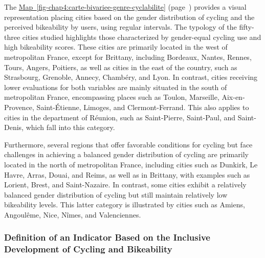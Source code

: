 \begin{refsegment}
The \hyperref[fig-chap4:carte-bivariee-genre-cyclabilite]{Map~\ref{fig-chap4:carte-bivariee-genre-cyclabilite}} (page~\pageref{fig-chap4:carte-bivariee-genre-cyclabilite}) provides a visual representation placing cities based on the gender distribution of cycling and the perceived bikeability by users, using regular intervals. The typology of the fifty-three cities studied highlights those characterized by gender-equal cycling use and high bikeability scores. These cities are primarily located in the west of metropolitan France, except for Brittany, including Bordeaux, Nantes, Rennes, Tours, Angers, Poitiers, as well as cities in the east of the country, such as Strasbourg, Grenoble, Annecy, Chambéry, and Lyon. In contrast, cities receiving lower evaluations for both variables are mainly situated in the south of metropolitan France, encompassing places such as Toulon, Marseille, Aix-en-Provence, Saint-Étienne, Limoges, and Clermont-Ferrand. This also applies to cities in the department of Réunion, such as Saint-Pierre, Saint-Paul, and Saint-Denis, which fall into this category.%

Furthermore, several regions that offer favorable conditions for cycling but face challenges in achieving a balanced gender distribution of cycling are primarily located in the north of metropolitan France, including cities such as Dunkirk, Le Havre, Arras, Douai, and Reims, as well as in Brittany, with examples such as Lorient, Brest, and Saint-Nazaire. In contrast, some cities exhibit a relatively balanced gender distribution of cycling but still maintain relatively low bikeability levels. This latter category is illustrated by cities such as Amiens, Angoulême, Nice, Nîmes, and Valenciennes.%

\subsubsection*{Definition of an Indicator Based on the Inclusive Development of Cycling and Bikeability
    \label{chap4:definition-indicateur-genre}
    }


\end{refsegment}
